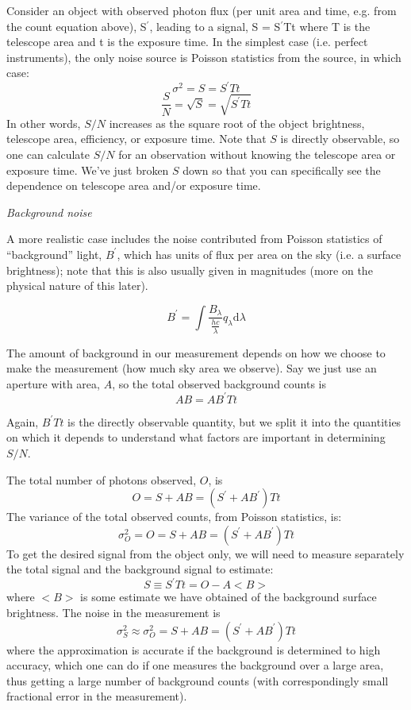 \documentclass[12pt]{article}
\begin{document}
Consider an object with observed photon flux (per unit area and time,
e.g. from the count equation above), S$^{\prime}$, leading
to a signal, S = S$^{\prime}$Tt where T is the telescope
area and t is the exposure time. In the simplest case (i.e. perfect
instruments), the only noise
source is Poisson statistics from the source, in which case:
    $$ \sigma^2 = S = S^{\prime}Tt $$
    $$ \frac{S}{N} = \sqrt{S} = \sqrt{S^{\prime}Tt} $$
In other words, $S/N$ increases as the square root of the object
brightness, telescope area, efficiency, or exposure time. Note that $S$
is directly observable, so one can calculate $S/N$ for an
observation without knowing the telescope area or exposure time.
We've just broken $S$ down so that you can specifically see the dependence on
telescope area and/or exposure time.

\emph{Background noise}

A more realistic case includes the noise contributed from Poisson
statistics of ``background'' light, $B^{\prime}$,
which has units of flux per area
on the sky (i.e. a surface brightness); note that this is also usually
given in magnitudes (more on the physical nature of
this later).

    $$ B^{\prime} = \int \frac{B_{\lambda}}{\frac{hc}{\lambda}}
       q_{\lambda}\textrm{d}\lambda $$

The amount of background in our measurement depends on how we choose
to make the measurement (how much sky area we observe). Say we just
use an aperture with area, $A$, so the total observed background counts
is
    $$ AB = AB^{\prime}Tt $$

Again, $B^{\prime}Tt$ is the directly observable quantity,
but we split it into the quantities on which it depends to understand
what factors are important in determining $S/N$. 

The total number of photons observed, $O$, is
    $$ O = S + AB = (S^{\prime} + AB^{\prime})Tt $$
The variance of the total observed counts, from Poisson statistics,
is:
    $$ \sigma^2_O = O =  S + AB = (S^{\prime} + AB^{\prime})Tt $$
To get the desired signal from the object only, we will need to
measure separately the total signal and the background signal to
estimate:
    $$ S \equiv S^{\prime}Tt = O-A <B> $$
where $<B>$ is some estimate we have obtained of the background
surface brightness. The noise in the measurement is
    $$ \sigma^2_S \approx \sigma^2_O =
    S + AB = (S^{\prime} + AB^{\prime})Tt $$
where the approximation is accurate if the background is determined to
high accuracy, which one can do if one measures the background over a
large area, thus getting a large number of background counts (with
correspondingly small fractional error in the measurement).
\end{document}
